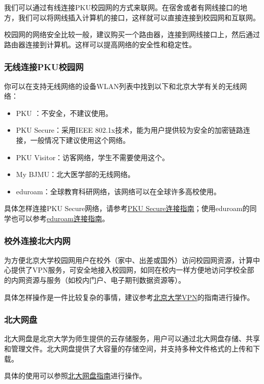 \documentclass[../main.tex]{subfiles}
\begin{document}
我们可以通过有线连接PKU校园网的方式来联网。在宿舍或者有网线接口的地方，我们可以将网线插入计算机的接口，这样就可以直接连接到校园网和互联网。

校园网的网络安全比较一般，建议购买一个路由器，连接到网线接口上，然后通过路由器连接到计算机。这样可以提高网络的安全性和稳定性。

\subsubsection{无线连接PKU校园网}

你可以在支持无线网络的设备WLAN列表中找到以下和北京大学有关的无线网络：
\begin{itemize}
    \item PKU ：不安全，不建议使用。
    \item PKU Secure：采用IEEE 802.1x技术，能为用户提供较为安全的加密链路连接，一般情况下建议使用这个网络。
    \item PKU Visitor：访客网络，学生不需要使用这个。
    \item My BJMU：北大医学部的无线网络。
    \item eduroam：全球教育科研网络，该网络可以在全球许多高校使用。
\end{itemize}
具体怎样连接PKU Secure网络，请参考\href{https://its.pku.edu.cn/setting_6.jsp}{PKU Secure连接指南}；使用eduroam的同学也可以参考\href{https://its.pku.edu.cn/service_1_eduroam.jsp}{eduroam连接指南}。

\subsubsection{校外连接北大内网}

为方便北京大学校园网用户在校外（家中、出差或国外）访问校园网资源，计算中心提供了VPN服务，可安全地接入校园网，如同在校内一样方便地访问学校全部的内网资源与服务（如校内门户、电子期刊数据资源等）。

具体怎样操作是一件比较复杂的事情，建议参考\href{https://its.pku.edu.cn/service_1_vpn.jsp}{北京大学VPN}的指南进行操作。

\subsubsection{北大网盘}

北大网盘是北京大学为师生提供的云存储服务，用户可以通过北大网盘存储、共享和管理文件。北大网盘提供了大容量的存储空间，并支持多种文件格式的上传和下载。

具体的使用可以参照\href{https://its.pku.edu.cn/service_1_webdisk.jsp}{北大网盘指南}进行操作。
\end{document}
